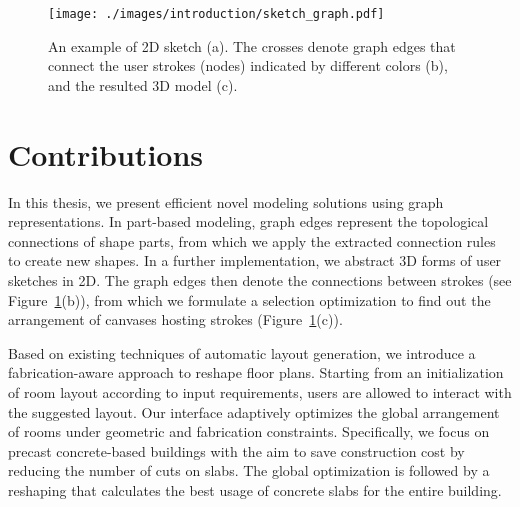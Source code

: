 \begin{figure}[t!]\centering
  \texttt{[image: ./images/introduction/sketch\_graph.pdf]}
  \caption[An example of 2D sketch.]{An example of 2D sketch (a). The crosses denote graph edges that connect the user strokes (nodes) indicated by different colors (b), and the resulted 3D model (c).}
  \label{fig:intro_sketch_graph}
\end{figure}

\section{Contributions}

In this thesis, we present efficient novel modeling solutions using graph representations. In part-based modeling, graph edges represent the topological connections of shape parts, from which we apply the extracted connection rules to create new shapes. In a further implementation, we abstract 3D forms of user sketches in 2D. The graph edges then denote the connections between strokes (see Figure~\ref{fig:intro_sketch_graph}(b)), from which we formulate a selection optimization to find out the arrangement of canvases hosting strokes (Figure~\ref{fig:intro_sketch_graph}(c)).

Based on existing techniques of automatic layout generation, we introduce a fabrication-aware approach to reshape floor plans. Starting from an initialization of room layout according to input requirements, users are allowed to interact with the suggested layout. Our interface adaptively optimizes the global arrangement of rooms under geometric and fabrication constraints. Specifically, we focus on precast concrete-based buildings with the aim to save construction cost by reducing the number of cuts on slabs. The global optimization is followed by a reshaping that calculates the best usage of concrete slabs for the entire building.


